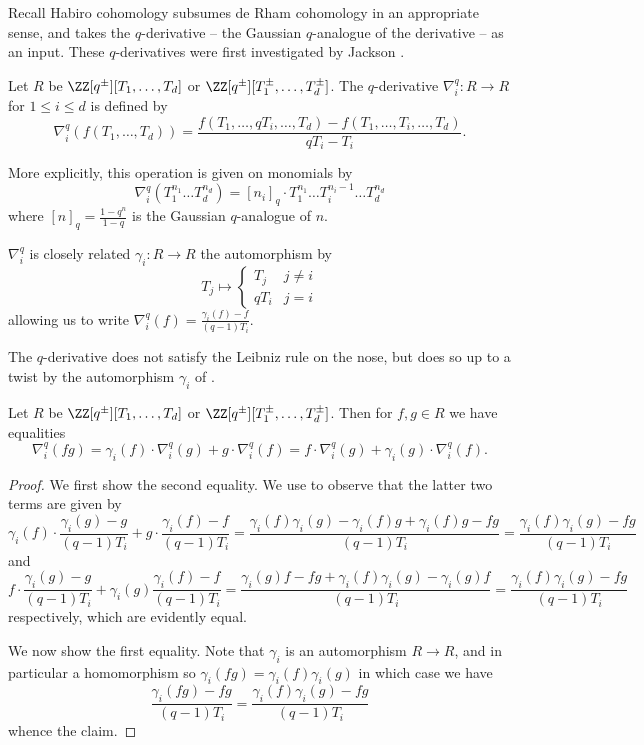 Recall Habiro cohomology subsumes de Rham cohomology in an appropriate sense, and takes the $q$-derivative -- the Gaussian $q$-analogue of the derivative -- as an input. These $q$-derivatives were first investigated by Jackson \cite{Jackson}.
\begin{definition}[$q$-Derivative]\label{def: q-derivative}
    Let $R$ be $\ZZ[q^{\pm}][T_{1},\dots,T_{d}]$ or $\ZZ[q^{\pm}][T_{1}^{\pm},\dots,T_{d}^{\pm}]$. The $q$-derivative $\nabla_{i}^{q}:R\to R$ for $1\leq i\leq d$ is defined by 
    $$\nabla_{i}^{q}(f(T_{1},\dots,T_{d}))=\frac{f(T_{1},\dots,qT_{i},\dots,T_{d})-f(T_{1},\dots,T_{i},\dots,T_{d})}{qT_{i}-T_{i}}.$$
\end{definition}
\begin{remark}
    More explicitly, this operation is given on monomials by 
    $$\nabla_{i}^{q}(T_{1}^{n_{1}}\dots T_{d}^{n_{d}})=[n_{i}]_{q}\cdot T_{1}^{n_{1}}\dots T_{i}^{n_{i}-1}\dots T_{d}^{n_{d}}$$
    where $[n]_{q}=\frac{1-q^{n}}{1-q}$ is the Gaussian $q$-analogue of $n$. 
\end{remark}
\begin{remark}\label{rmk: gamma i maps}
    $\nabla_{i}^{q}$ is closely related $\gamma_{i}:R\to R$ the automorphism by 
    $$T_{j}\mapsto\begin{cases}
        T_{j} & j\neq i \\
        qT_{i} & j=i
    \end{cases}$$
    allowing us to write $\nabla_{i}^{q}(f)=\frac{\gamma_{i}(f)-f}{(q-1)T_{i}}$. 
\end{remark}
The $q$-derivative does not satisfy the Leibniz rule on the nose, but does so up to a twist by the automorphism $\gamma_{i}$ of . 
\begin{lemma}\label{lem: twisted q-leibniz}
    Let $R$ be $\ZZ[q^{\pm}][T_{1},\dots,T_{d}]$ or $\ZZ[q^{\pm}][T_{1}^{\pm},\dots,T_{d}^{\pm}]$. Then for $f,g\in R$ we have equalities 
    $$\nabla_{i}^{q}(fg)=\gamma_{i}(f)\cdot\nabla_{i}^{q}(g)+g\cdot\nabla_{i}^{q}(f)=f\cdot\nabla_{i}^{q}(g)+\gamma_{i}(g)\cdot\nabla^{q}_{i}(f).$$
\end{lemma}
\begin{proof}
    We first show the second equality. We use  to observe that the latter two terms are given by 
    $$\gamma_{i}(f)\cdot\frac{\gamma_{i}(g)-g}{(q-1)T_{i}}+g\cdot\frac{\gamma_{i}(f)-f}{(q-1)T_{i}}=\frac{\gamma_{i}(f)\gamma_{i}(g)-\gamma_{i}(f)g+\gamma_{i}(f)g-fg}{(q-1)T_{i}}=\frac{\gamma_{i}(f)\gamma_{i}(g)-fg}{(q-1)T_{i}}$$
    and 
    $$f\cdot\frac{\gamma_{i}(g)-g}{(q-1)T_{i}}+\gamma_{i}(g)\frac{\gamma_{i}(f)-f}{(q-1)T_{i}}=\frac{\gamma_{i}(g)f-fg+\gamma_{i}(f)\gamma_{i}(g)-\gamma_{i}(g)f}{(q-1)T_{i}}=\frac{\gamma_{i}(f)\gamma_{i}(g)-fg}{(q-1)T_{i}}$$
    respectively, which are evidently equal. 

    We now show the first equality. Note that $\gamma_{i}$ is an automorphism $R\to R$, and in particular a homomorphism so $\gamma_{i}(fg)=\gamma_{i}(f)\gamma_{i}(g)$ in which case we have 
    $$\frac{\gamma_{i}(fg)-fg}{(q-1)T_{i}}=\frac{\gamma_{i}(f)\gamma_{i}(g)-fg}{(q-1)T_{i}}$$
    whence the claim. 
\end{proof}
